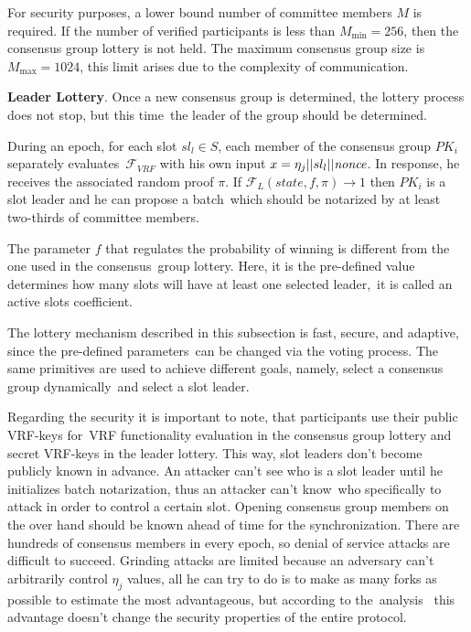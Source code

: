 For security purposes, a lower bound number of committee members $M$ is required.
If the number of verified participants is less than ${M_{\min}=256}$, then the consensus group lottery is not held.
The maximum consensus group size is ${M_{\max}=1024}$, this limit arises due to the complexity of communication.

\textbf{Leader Lottery}.
Once a new consensus group is determined, the lottery process does not stop, but this time\
the leader of the group should be determined.

During an epoch, for each slot ${sl_l \in S}$, each member of the consensus group $PK_i$ separately evaluates\
${\mathcal{F}}_{VRF}$ with his own input ${x = \eta_j || sl_l || \emph{nonce}}$.
In response, he receives the associated random proof $\pi$.
If ${\mathcal{F}}_{L}(state, f, \pi) \rightarrow 1$ then $PK_i$ is a slot leader and he can propose a batch\
which should be notarized by at least two-thirds of committee members.

The parameter $f$ that regulates the probability of winning is different from the one used in the consensus\
group lottery.
Here, it is the pre-defined value determines how many slots will have at least one selected leader,\
it is called an active slots coefficient.

The lottery mechanism described in this subsection is fast, secure, and adaptive, since the pre-defined parameters\
can be changed via the voting process.
The same primitives are used to achieve different goals, namely, select a consensus group dynamically\
and select a slot leader.

Regarding the security it is important to note, that participants use their public VRF-keys for\
VRF functionality evaluation in the consensus group lottery and secret VRF-keys in the leader lottery.
This way, slot leaders don't become publicly known in advance.
An attacker can't see who is a slot leader until he initializes batch notarization, thus an attacker can't know\
who specifically to attack in order to control a certain slot.
Opening consensus group members on the over hand should be known ahead of time for the synchronization.
There are hundreds of consensus members in every epoch, so denial of service attacks are difficult to succeed.
Grinding attacks are limited because an adversary can't arbitrarily control $\eta_j$ values,
all he can try to do is to make as many forks as possible to estimate the most advantageous, but according to the\
analysis~\cite{cryptoeprint:2017/573} this advantage doesn't change the security properties of the entire protocol.

